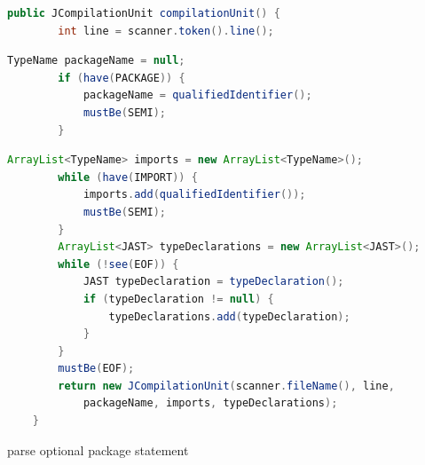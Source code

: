 \documentclass[8pt,a4paper,compress]{beamer}
\begin{document}
\begin{frame}[fragile]
\transdissolve

\begin{tcolorbox}[enhanced,drop shadow southwest,sharp corners,size=fbox,colback=white,fontlower=\small\ttfamily,collower=silver900]

\begin{lstlisting}[language=Java,style=focusout]
    public JCompilationUnit compilationUnit() {
        int line = scanner.token().line();
\end{lstlisting}
\begin{lstlisting}[language=Java,style=focusin,backgroundcolor=\color{lime100}]
        TypeName packageName = null;
        if (have(PACKAGE)) {
            packageName = qualifiedIdentifier();
            mustBe(SEMI);
        }
\end{lstlisting}
\begin{lstlisting}[language=Java,style=focusout]
        ArrayList<TypeName> imports = new ArrayList<TypeName>();
        while (have(IMPORT)) {
            imports.add(qualifiedIdentifier());
            mustBe(SEMI);
        }
        ArrayList<JAST> typeDeclarations = new ArrayList<JAST>();
        while (!see(EOF)) {
            JAST typeDeclaration = typeDeclaration();
            if (typeDeclaration != null) {
                typeDeclarations.add(typeDeclaration);
            }
        }
        mustBe(EOF);
        return new JCompilationUnit(scanner.fileName(), line, 
            packageName, imports, typeDeclarations);
    }
\end{lstlisting}

\tcblower
\begin{minipage}[t][.25cm][t]{\textwidth}
parse optional package statement
\end{minipage}
\end{tcolorbox}
\end{frame}
\end{document}
